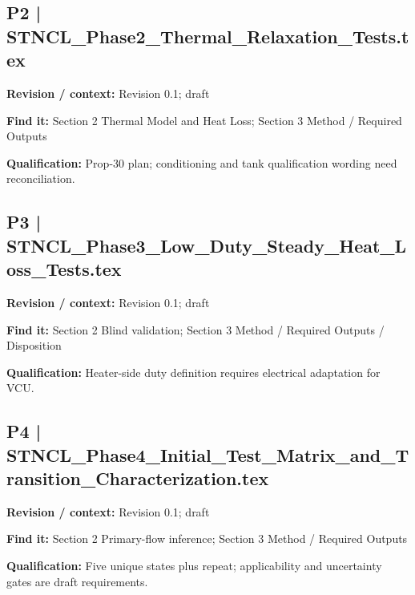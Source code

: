 \documentclass[11pt]{article}
\begin{document}
\par
\par\noindent\begin{minipage}{\textwidth}\small
\subsection*{P2 | STNCL\_\allowbreak{}Phase2\_\allowbreak{}Thermal\_\allowbreak{}Relaxation\_\allowbreak{}Tests.tex}
\textbf{Revision / context:} Revision 0.1; draft\par
\textbf{Find it:} Section 2 Thermal Model and Heat Loss; Section 3 Method / Required Outputs\par
\textbf{Qualification:} Prop-30 plan; conditioning and tank qualification wording need reconciliation.\par
\end{minipage}\par\vspace{5pt}
\par\noindent\begin{minipage}{\textwidth}\small
\subsection*{P3 | STNCL\_\allowbreak{}Phase3\_\allowbreak{}Low\_\allowbreak{}Duty\_\allowbreak{}Steady\_\allowbreak{}Heat\_\allowbreak{}Loss\_\allowbreak{}Tests.tex}
\textbf{Revision / context:} Revision 0.1; draft\par
\textbf{Find it:} Section 2 Blind validation; Section 3 Method / Required Outputs / Disposition\par
\textbf{Qualification:} Heater-side duty definition requires electrical adaptation for VCU.\par
\end{minipage}\par\vspace{5pt}
\par\noindent\begin{minipage}{\textwidth}\small
\subsection*{P4 | STNCL\_\allowbreak{}Phase4\_\allowbreak{}Initial\_\allowbreak{}Test\_\allowbreak{}Matrix\_\allowbreak{}and\_\allowbreak{}Transition\_\allowbreak{}Characterization.tex}
\textbf{Revision / context:} Revision 0.1; draft\par
\textbf{Find it:} Section 2 Primary-flow inference; Section 3 Method / Required Outputs\par
\textbf{Qualification:} Five unique states plus repeat; applicability and uncertainty gates are draft requirements.\par
\end{minipage}\par\vspace{5pt}
\end{document}
